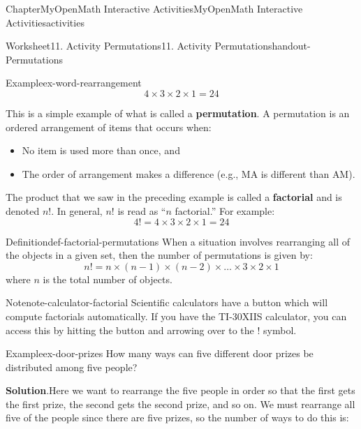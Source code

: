 \documentclass[oneside,10pt,]{book}
\newcommand{\blocktitlefont}{\relax}
\newcommand{\ptxlistdisc}{\raisebox{0.3ex}{\textbullet}}
\newcommand{\terminology}[1]{\textbf{#1}}
\newcommand{\kbd}[1]{\keys{{#1}}}
\begin{document}
\begin{chapterptx}{Chapter}{MyOpenMath Interactive Activities}{}{MyOpenMath Interactive Activities}{}{}{activities}
\begin{worksheet-section}{Worksheet}{11. Activity Permutations}{}{11. Activity Permutations}{}{}{handout-Permutations}
\begin{example}{Example}{}{ex-word-rearrangement}
\begin{equation*}
4 \times 3 \times 2 \times 1 = 24
\end{equation*}
%
\end{example}
This is a simple example of what is called a \terminology{permutation}. A permutation is an ordered arrangement of items that occurs when:%
\begin{itemize}[label=\ptxlistdisc]
\item{}No item is used more than once, and%
\item{}The order of arrangement makes a difference (e.g., \(\text{MA}\) is different than \(\text{AM}\)).%
\end{itemize}
%
\par
The product that we saw in the preceding example is called a \terminology{factorial} and is denoted \(n!\). In general, \(n!\) is read as \textquotedblleft{}\(n\) factorial.\textquotedblright{} For example:%
\begin{equation*}
4! = 4 \times 3 \times 2 \times 1 = 24
\end{equation*}
%
\begin{definition}{Definition}{}{def-factorial-permutations}%
 When a situation involves rearranging all of the objects in a given set, then the number of permutations is given by:%
\begin{equation*}
n! = n \times (n-1) \times (n-2) \times \dots \times 3 \times 2 \times 1
\end{equation*}
where \(n\) is the total number of objects.%
\end{definition}
\begin{note}{Note}{}{note-calculator-factorial}%
Scientific calculators have a button which will compute factorials automatically. If you have the TI-30XIIS calculator, you can access this by hitting the \kbd{PRB} button and arrowing over to the \(!\) symbol.%
\end{note}
\begin{example}{Example}{}{ex-door-prizes}%
How many ways can five different door prizes be distributed among five people?%
\par\smallskip%
\noindent\textbf{\blocktitlefont Solution}.\hypertarget{ex-door-prizes-2}{}\quad{}Here we want to rearrange the five people in order so that the first gets the first prize, the second gets the second prize, and so on. We must rearrange all five of the people since there are five prizes, so the number of ways to do this is:%
\begin{equation*}

\end{equation*}
\end{example}
\end{worksheet-section}
\end{chapterptx}
\end{document}
